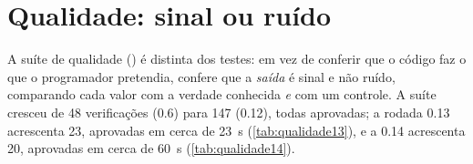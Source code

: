 \section{Qualidade: sinal ou ruído}\label{sec:aval-qualidade}

A suíte de qualidade () é distinta dos testes: em vez de conferir que o código faz o que o programador pretendia, confere que a \emph{saída} é sinal e não ruído, comparando cada valor com a verdade conhecida \emph{e} com um controle. A suíte cresceu de 48 verificações (0.6) para 147 (0.12), todas aprovadas; a rodada 0.13 acrescenta 23, aprovadas em cerca de 23~s (\autoref{tab:qualidade13}), e a 0.14 acrescenta 20, aprovadas em cerca de 60~s (\autoref{tab:qualidade14}).

